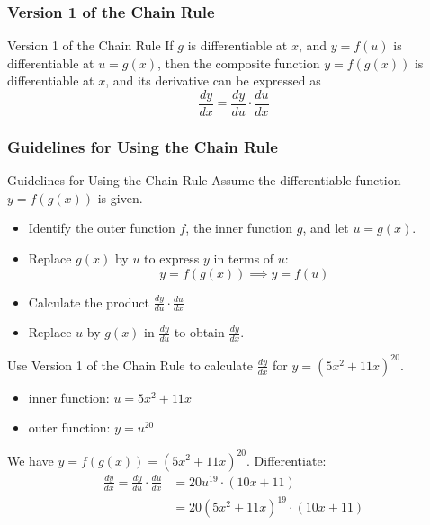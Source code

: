 \documentclass[cal1spr16Lectures.tex]{subfiles}
\begin{document}
\subsubsection{Version 1 of the Chain Rule}

\begin{frame}{\small Version 1 of the Chain Rule}
If $g$ is differentiable at $x$, and $y=f(u)$ is differentiable at $u=g(x)$, then the composite function $y=f(g(x))$ is differentiable at $x$, and its derivative can be expressed as 
\[\frac{dy}{dx}=\frac{dy}{du} \cdot \frac{du}{dx}\]
\end{frame}

\subsubsection{Guidelines for Using the Chain Rule}

\begin{frame}{\small Guidelines for Using the Chain Rule}\footnotesize
Assume the differentiable function $y=f(g(x))$ is given.
\begin{itemize}
	\item[1.] Identify the outer function $f$, the inner function $g$, and let $u=g(x).$
	\item[2.] Replace $g(x)$ by $u$ to express $y$ in terms of $u$:
	\[y=f(g(x)) \implies y=f(u)\]
	\item[3.]  Calculate the product $\frac{dy}{du} \cdot \frac{du}{dx}$
	\item[4.] Replace $u$ by $g(x)$ in $\frac{dy}{du}$ to obtain $\frac{dy}{dx}.$
\end{itemize}
\end{frame}

\begin{frame}\footnotesize
\begin{ex} Use Version 1 of the Chain Rule to calculate $\textstyle\frac{dy}{dx}$ for $y=(5x^2 +11x)^{20}$. \end{ex}
\begin{itemize}
\item inner function: $u=5x^2+11x$ 
\item outer function: $y=u^{20}$
\end{itemize}

\vspace{1pc}
We have $y = f(g(x)) = (5x^2 +11x)^{20}$.  Differentiate:
\begin{align*} 
\frac{dy}{dx}= \frac{dy}{du}\cdot\frac{du}{dx} &= 20u^{19} \cdot (10x+11) \\
 &=20(5x^2 +11x)^{19} \cdot (10x+11)
\end{align*}
\end{frame}
\end{document}
